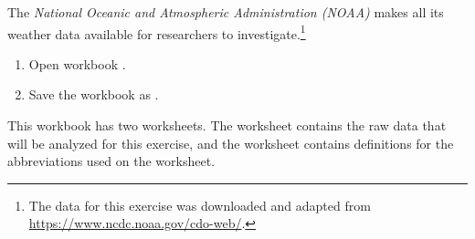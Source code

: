 The \textit{National Oceanic and Atmospheric Administration (NOAA)} makes all its weather data available for researchers to investigate.\footnote{The data for this exercise was downloaded and adapted from \url{https://www.ncdc.noaa.gov/cdo-web/}.}

\begin{enumbox}
	\begin{enumerate}
		\item Open workbook .
		\item Save the workbook as .
	\end{enumerate}
\end{enumbox}

This workbook has two worksheets. The  worksheet contains the raw data that will be analyzed for this exercise, and the  worksheet contains definitions for the abbreviations used on the  worksheet.

